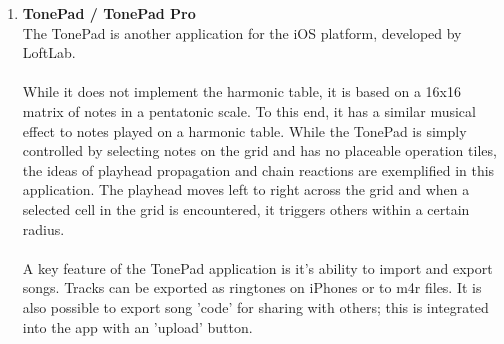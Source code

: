 \documentclass[10pt,a4paper]{article}
\begin{document}
\begin{enumerate}
\item \textbf{TonePad / TonePad Pro}\\
The TonePad is another application for the iOS platform, developed by LoftLab.\cite{tonepaditunes} \\
\\
While it does not implement the harmonic table, it is based on a 16x16 matrix of notes in a pentatonic scale. To this end, it has a similar musical effect to notes played on a harmonic table. While the TonePad is simply controlled by selecting notes on the grid and has no placeable operation tiles, the ideas of playhead propagation and chain reactions are exemplified in this application. The playhead moves left to right across the grid and when a selected cell in the grid is encountered, it triggers others within a certain radius. \\
\\
A key feature of the TonePad application is it's ability to import and export songs. Tracks can be exported as ringtones on iPhones or to m4r files. It is also possible to export song 'code' for sharing with others; this is integrated into the app with an 'upload' button. 
\end{enumerate}
\end{document}
